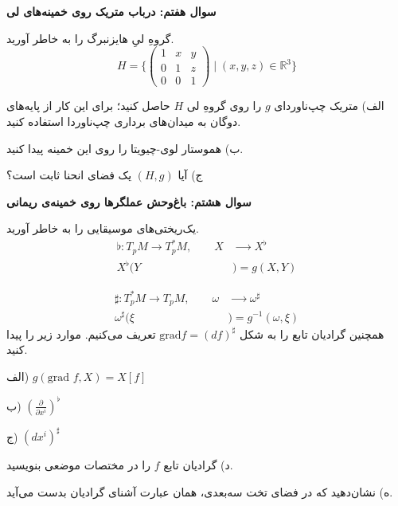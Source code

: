 \documentclass[a4paper, 12pt]{article}
\newenvironment{parind}{%
	\par%
	\medskip
	\leftskip=0mm\rightskip=7mm
	\noindent\ignorespaces}{%
	\par\medskip}
\begin{document}
\newpage
\textbf{سوال هفتم:  درباب متریک روی خمینه‌های لی}

\vspace{0.7em}
گروهِ لیِ هایزنبرگ را به خاطر آورید.
\[
H = \Biggl\{
\begin{pmatrix}
	1 & x & y \\ 0 & 1 & z \\ 0 & 0 & 1
\end{pmatrix} \; \Big| \; (x,y,z) \in \mathbb{R}^3
\Biggr\}
\]
\begin{parind}
	الف) متریک چپ‌ناوردای 
	$g$ را روی گروهِ لی
	$H$
	حاصل کنید؛ برای این کار از پایه‌های دوگان به میدان‌های برداری چپ‌ناوردا استفاده کنید.
	
	ب) هموستار لوی-چیویتا را روی این خمینه پیدا کنید.
	
	ج) آیا
	$(H,g)$
	یک فضای انحنا ثابت است؟
\end{parind}

\newpage
\textbf{سوال هشتم: باغ‌وحش عملگر‌ها روی خمینه‌ی ‌ریمانی}

\vspace{0.7em}
یک‌ریختی‌های موسیقایی را به خاطر آورید.
\begin{equation*}
	\begin{aligned}
		\flat: T_pM \xrightarrow{\quad} T_p^*M , \qquad X& \xrightarrow{\qquad } X^\flat \\ 
		X^\flat (Y&)= g(X,Y)
	\end{aligned}
\end{equation*}

\begin{equation*}
	\begin{aligned}
		\sharp: T_p^*M   \xrightarrow{\quad} T_pM , \qquad \omega& \xrightarrow{\qquad } \omega^\sharp \\ 
		\omega^\sharp (\xi&)= g^{-1}(\omega,\xi)
	\end{aligned}
\end{equation*}
همچنین گرادیان تابع را به شکل 
$\text{grad} f = (df)^\sharp$
تعریف می‌کنیم. موارد زیر را پیدا کنید.
\begin{parind}
	الف) 
	$g(\text{grad }f , X) = X[f]$
	
	ب)
	$(\frac{\partial}{\partial x^i})^\flat$
	
	ج)
	$(dx^i)^\sharp$
	
	د)
	گرادیان تابع $f$ را در مختصات موضعی بنویسید.
	
	ه) نشان‌دهید که در فضای تخت سه‌بعدی، همان عبارت آشنای گرادیان بدست می‌آید.
	 
\end{parind}
\end{document}
